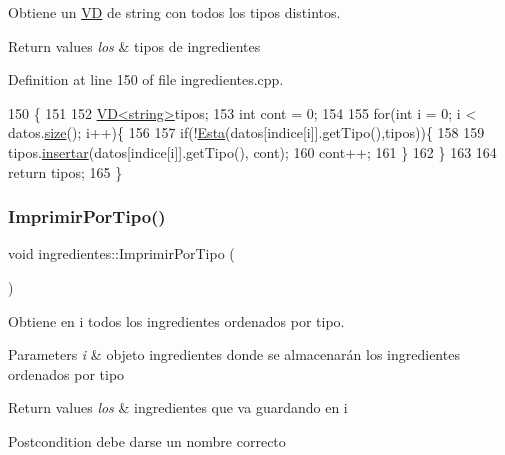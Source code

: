 Obtiene un \hyperlink{classVD}{VD} de string con todos los tipos distintos. 


\begin{DoxyRetVals}{Return values}
{\em los} & tipos de ingredientes \\
\hline
\end{DoxyRetVals}


Definition at line 150 of file ingredientes.\+cpp.


\begin{DoxyCode}
150                                  \{
151 
152      \hyperlink{classVD}{VD<string>}tipos;
153      \textcolor{keywordtype}{int} cont = 0;
154 
155      \textcolor{keywordflow}{for}(\textcolor{keywordtype}{int} i = 0; i < datos.\hyperlink{classVD_a411ad026db1c8e0617d9031f1f1017a5}{size}(); i++)\{
156 
157         \textcolor{keywordflow}{if}(!\hyperlink{ingredientes_8cpp_ae557f016f908fddaeda9296f7eccbf5d}{Esta}(datos[indice[i]].getTipo(),tipos))\{
158 
159             tipos.\hyperlink{classVD_a10bba26b426aa83456437543d794b429}{insertar}(datos[indice[i]].getTipo(), cont);
160             cont++;
161         \}
162     \}
163 
164     \textcolor{keywordflow}{return} tipos;
165 \}
\end{DoxyCode}
\mbox{\label{classingredientes_ada1c7580434d7802ee1e87196d15524b}} 
\subsubsection{\texorpdfstring{Imprimir\+Por\+Tipo()}{ImprimirPorTipo()}}
{\footnotesize\ttfamily void ingredientes\+::\+Imprimir\+Por\+Tipo (\begin{DoxyParamCaption}{ }\end{DoxyParamCaption})}



Obtiene en i todos los ingredientes ordenados por tipo. 


\begin{DoxyParams}{Parameters}
{\em i} & objeto ingredientes donde se almacenarán los ingredientes ordenados por tipo \\
\hline
\end{DoxyParams}

\begin{DoxyRetVals}{Return values}
{\em los} & ingredientes que va guardando en i \\
\hline
\end{DoxyRetVals}
\begin{DoxyPostcond}{Postcondition}
debe darse un nombre correcto 
\end{DoxyPostcond}


